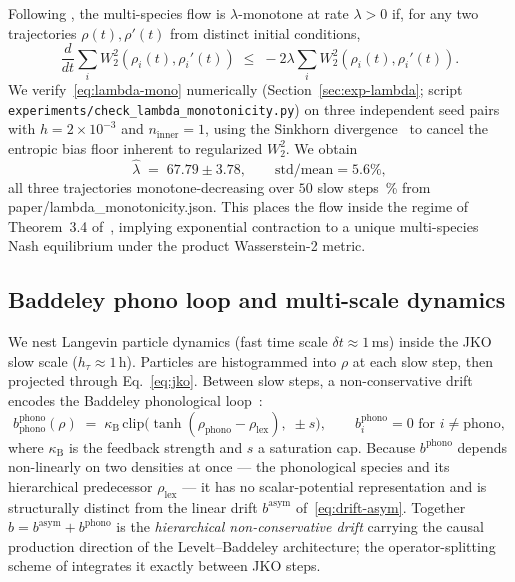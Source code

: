\documentclass[11pt]{article}
\begin{document}
Following \cite{conger2025monotone}, the multi-species flow is
$\lambda$-monotone at rate $\lambda > 0$ if, for any two trajectories
$\rho(t), \rho'(t)$ from distinct initial conditions,
\begin{equation}
  \frac{d}{dt} \sum_i W_2^2(\rho_i(t), \rho_i'(t))
    \;\le\; -2\lambda \sum_i W_2^2(\rho_i(t), \rho_i'(t)).
  \label{eq:lambda-mono}
\end{equation}
We verify~\eqref{eq:lambda-mono} numerically (Section~\ref{sec:exp-lambda};
script \texttt{experiments/check\_lambda\_monotonicity.py}) on three
independent seed pairs with $h = 2\times 10^{-3}$ and
$n_{\mathrm{inner}} = 1$, using the Sinkhorn divergence~%
\cite{feydy2019interpolating} to cancel the entropic bias floor
inherent to regularized $W_2^2$. We obtain
\begin{equation}
  \hat\lambda \;=\; 67.79 \pm 3.78,
  \qquad \text{std/mean} = 5.6\%,
  \label{eq:lambda-estimate}
\end{equation}
all three trajectories monotone-decreasing over $50$ slow
steps~{\small\% from paper/lambda\_monotonicity.json}. This places the
flow inside the regime of Theorem~3.4
of~\cite{conger2025monotone}, implying exponential contraction to a
unique multi-species Nash equilibrium under the product Wasserstein-2
metric.

\subsection{Baddeley phono loop and multi-scale dynamics}
\label{sec:phonoloop}
We nest Langevin particle dynamics (fast time scale $\delta t \approx 1\,$ms)
inside the JKO slow scale ($h_\tau \approx 1\,$h). Particles are
histogrammed into $\rho$ at each slow step, then projected through
Eq.~\ref{eq:jko}. Between slow steps, a non-conservative drift encodes
the Baddeley phonological loop~\cite{baddeley1992working}:
\begin{equation}
  b^{\mathrm{phono}}_{\mathrm{phono}}(\rho)
    \;=\; \kappa_{\mathrm{B}}\,\mathrm{clip}\!\big(\tanh(\rho_{\mathrm{phono}} - \rho_{\mathrm{lex}}),\; \pm s\big),
  \qquad b^{\mathrm{phono}}_i = 0 \text{ for } i \neq \mathrm{phono},
  \label{eq:phono-drift}
\end{equation}
where $\kappa_{\mathrm{B}}$ is the feedback strength and $s$ a
saturation cap. Because $b^{\mathrm{phono}}$ depends non-linearly on
two densities at once --- the phonological species and its hierarchical
predecessor $\rho_{\mathrm{lex}}$ --- it has no scalar-potential
representation and is structurally distinct from the linear drift
$b^{\mathrm{asym}}$ of~\eqref{eq:drift-asym}. Together
$b = b^{\mathrm{asym}} + b^{\mathrm{phono}}$ is the
\emph{hierarchical non-conservative drift} carrying the causal
production direction of the Levelt--Baddeley architecture; the
operator-splitting scheme of \cite{gallouet2017splitting} integrates it
exactly between JKO steps.
\end{document}
